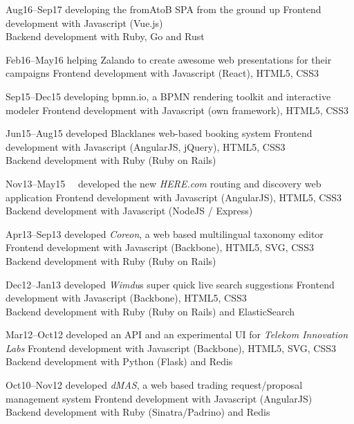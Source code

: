 \documentclass[]{friggeri-cv}
\begin{document}
\begin{entrylist}
  \entry
    {Aug16–Sep17}
    {developing the fromAtoB SPA from the ground up}
    {}
    {Frontend development with Javascript (Vue.js)\\
     Backend development with Ruby, Go and Rust}

  \entry
    {Feb16–May16}
    {helping Zalando to create awesome web presentations for their campaigns}
    {}
    {Frontend development with Javascript (React), HTML5, CSS3}

  \entry
    {Sep15–Dec15}
    {developing bpmn.io, a BPMN rendering toolkit and interactive modeler}
    {}
    {Frontend development with Javascript (own framework), HTML5, CSS3}

  \entry
    {Jun15–Aug15}
    {developed Blacklanes web-based booking system}
    {}
    {Frontend development with Javascript (AngularJS, jQuery), HTML5, CSS3\\
     Backend development with Ruby (Ruby on Rails)}

  \entry
    {Nov13–May15~~}
    {developed the new \emph{HERE.com} routing and discovery web application}
    {}
    {Frontend development with Javascript (AngularJS), HTML5, CSS3\\
     Backend development with Javascript (NodeJS / Express)}

  \entry
    {Apr13–Sep13}
    {developed \emph{Coreon}, a web based multilingual taxonomy editor}
    {}
    {Frontend development with Javascript (Backbone), HTML5, SVG, CSS3\\
     Backend development with Ruby (Ruby on Rails)}

  \entry
    {Dec12–Jan13}
    {developed \emph{Wimdu}s super quick live search suggestions}
    {}
    {Frontend development with Javascript (Backbone), HTML5, CSS3\\
     Backend development with Ruby (Ruby on Rails) and ElasticSearch}

  \entry
    {Mar12–Oct12}
    {developed an API and an experimental UI for \emph{Telekom Innovation Labs}}
    {}
    {Frontend development with Javascript (Backbone), HTML5, SVG, CSS3\\
     Backend development with Python (Flask) and Redis}

  \entry
    {Oct10–Nov12}
    {developed \emph{dMAS}, a web based trading request/proposal management system}
    {}
    {Frontend development with Javascript (AngularJS)\\
     Backend development with Ruby (Sinatra/Padrino) and Redis}


\end{entrylist}
\end{document}
